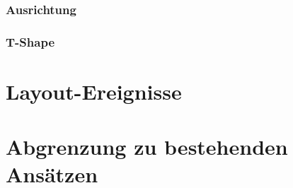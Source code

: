 
\subsubsection{Ausrichtung}


\subsubsection{T-Shape}


\section{Layout-Ereignisse}


\section{Abgrenzung zu bestehenden Ansätzen}

